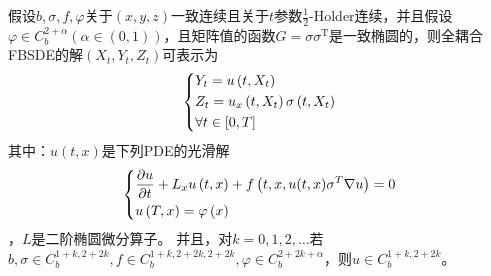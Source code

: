 			假设$b,\sigma,f,\varphi$关于$(x,y,z)$一致连续且关于$t$参数$\frac 12$-Holder连续，并且假设$\varphi \in C_b^{2+\alpha}(\alpha \in (0,1))$，且矩阵值的函数$G=\sigma{\sigma}^\mathrm{T}$是一致椭圆的，则全耦合FBSDE的解$(X_t,Y_t,Z_t)$可表示为
					\begin{equation*}
					\centering
					\left\{\begin{lgathered}
					{{Y_t} = u\left( {t,{X_t}} \right)}\\
					{{Z_t} = {u_x}\left( {t,{X_t}} \right)\sigma \left( {t,{X_t}} \right)}\\
					{\forall t \in \left[ {0,T} \right]}
					\end{lgathered} \right.
					\end{equation*}
			其中：$u(t,x)$是下列PDE的光滑解
					\begin{equation*}
					\centering
					\left\{\begin{lgathered}
					{\frac{{\partial u}}{{\partial t}} + {L_x}u\left( {t,x} \right) + f\left( {t,x,u(t,x){\sigma ^T}\nabla u} \right) = 0}\\
					{u\left( {T,x} \right) = \varphi \left( x \right)}
					\end{lgathered} \right.
					\end{equation*}
			，$L$是二阶椭圆微分算子。
			并且，对$k=0,1,2,\ldots$若$b,\sigma \in {C_b^{1+k,2+2k}},f  \in {C_b^{1+k,2+2k,2+2k}},\varphi \in {C_b^{2+2k+\alpha}}$，则$u \in {C_b^{1+k,2+2k}}$。
